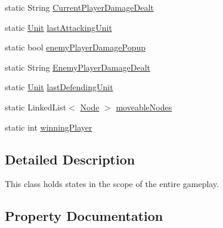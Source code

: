 \begin{DoxyCompactItemize}
\item 
static String \hyperlink{class_model_1_1_game_state_a829479b1c3cf8a4019a38c09990f2b7d}{Current\+Player\+Damage\+Dealt}
\item 
static \hyperlink{interface_model_1_1_unit_module_1_1_unit}{Unit} \hyperlink{class_model_1_1_game_state_a1bacc8a1b6e6959dea52d8a6cf7aa831}{last\+Attacking\+Unit}
\item 
static bool \hyperlink{class_model_1_1_game_state_af42c3aff2e08038bbc07d696f36fdd4b}{enemy\+Player\+Damage\+Popup}
\item 
static String \hyperlink{class_model_1_1_game_state_a32226ed0679f9e47a0e7ed4cb2ed1009}{Enemy\+Player\+Damage\+Dealt}
\item 
static \hyperlink{interface_model_1_1_unit_module_1_1_unit}{Unit} \hyperlink{class_model_1_1_game_state_a129d00c79e3a48b00089ef2d98605810}{last\+Defending\+Unit}
\item 
static Linked\+List$<$ \hyperlink{class_model_1_1_map_module_1_1_node}{Node} $>$ \hyperlink{class_model_1_1_game_state_aa2e325332a755c971d36c7c388d136d2}{moveable\+Nodes}
\item 
static int \hyperlink{class_model_1_1_game_state_a87cc1bbbd0fef930a435e4ac2d941bfd}{winning\+Player}
\end{DoxyCompactItemize}


\subsection{Detailed Description}
This class holds states in the scope of the entire gameplay. 



\subsection{Property Documentation}
\hypertarget{class_model_1_1_game_state_ab5781c1403edc30064ae2a8cbaad4c4c}{}\label{class_model_1_1_game_state_ab5781c1403edc30064ae2a8cbaad4c4c} 
